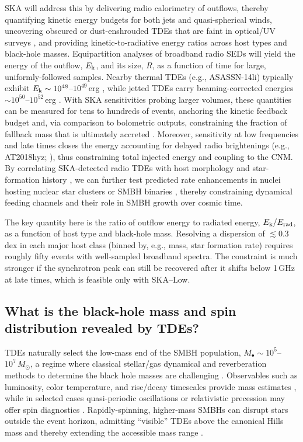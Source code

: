 \documentclass[a4paper,11pt]{article}
\begin{document}
SKA will address this by delivering radio calorimetry of outflows, thereby quantifying kinetic energy budgets for both jets and quasi-spherical winds, uncovering obscured or dust-enshrouded TDEs that are faint in optical/UV surveys \citep{Mattila2018}, and providing kinetic-to-radiative energy ratios across host types and black-hole masses. Equipartition analyses of broadband radio SEDs \citep{BarniolDuran2013} will yield the energy of the outflow, $E_{\rm k}$, and its size, $R$, as a function of time for large, uniformly-followed samples. Nearby thermal TDEs (e.g., ASASSN-14li) typically exhibit $E_{\rm k}\sim 10^{48}$--$10^{49}\,$erg \citep{Alexander2016,vanVelzen2016}, while jetted TDEs carry beaming-corrected energies $\sim 10^{50}$--$10^{52}\,$erg \citep{Bloom2011,Zauderer2011}. With SKA sensitivities probing larger volumes, these quantities can be measured for tens to hundreds of events, anchoring the kinetic feedback budget and, via comparison to bolometric outputs, constraining the fraction of fallback mass that is ultimately accreted \citep{Bonnerot2020}. Moreover, sensitivity at low frequencies and late times closes the energy accounting for delayed radio brightenings (e.g., AT2018hyz; \citealt{Cendes2022}), thus constraining total injected energy and coupling to the CNM. By correlating SKA-detected radio TDEs with host morphology and star-formation history \citep{vanVelzen2021}, we can further test predicted rate enhancements in nuclei hosting nuclear star clusters or SMBH binaries \citep{Chen2011,Stone2017}, thereby constraining dynamical feeding channels and their role in SMBH growth over cosmic time.

The key quantity here is the ratio of outflow energy to radiated energy, $E_{\rm k}/E_{\rm rad}$, as a function of host type and black-hole mass. Resolving a dispersion of $\lesssim 0.3$\,dex in each major host class (binned by, e.g., mass, star formation rate) requires roughly fifty events with well-sampled broadband spectra. The constraint is much stronger if the synchrotron peak can still be recovered after it shifts below 1\,GHz at late times, which is feasible only with SKA--Low.

\subsection{What is the black-hole mass and spin distribution revealed by TDEs?}

TDEs naturally select the low-mass end of the SMBH population, $M_\bullet\sim 10^{5}$--$10^{7}\,M_\odot$, a regime where classical stellar/gas dynamical and reverberation methods to determine the black hole masses are challenging \citep{Stone2016, Wevers2019}. Observables such as luminosity, color temperature, and rise/decay timescales provide mass estimates \citep{Mockler2019,Hammerstein2023,Mummery2024}, while in selected cases quasi-periodic oscillations or relativistic precession may offer spin diagnostics \citep{Reis2012,Pasham2019, Pasham2024,Zhang2025}. Rapidly-spinning, higher-mass SMBHs can disrupt stars outside the event horizon, admitting ``visible'' TDEs above the canonical Hills mass and thereby extending the accessible mass range \citep{Kesden2012,Leloudas2016,Gafton2019}. 
\end{document}
